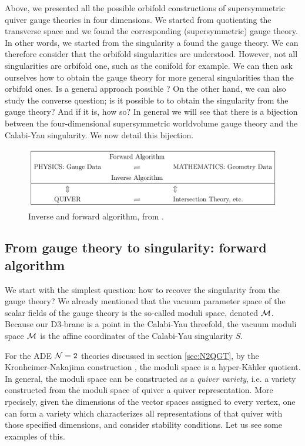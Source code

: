     Above, we presented all the possible orbifold constructions of supersymmetric quiver gauge theories in four dimensions. We started from quotienting the transverse space and we found the corresponding (supersymmetric) gauge theory. In other words, we started from the singularity a found the gauge theory. We can therefore consider that the orbifold singularities are understood. However, not all singularities are orbifold one, such as the conifold for example. We can then ask ourselves how to obtain the gauge theory for more general singularities than the orbifold ones. Is a general approach possible ? On the other hand, we can also study the converse question; is it possible to to obtain the singularity from the gauge theory? And if it is, how so? In general we will see that there is a bijection between the four-dimensional supersymmetric worldvolume gauge theory and the Calabi-Yau singularity. We now detail this bijection.

    \begin{figure}[H]
        \centering
        \includegraphics[scale=0.3]{Pictures/algorithm.png}
        \caption{Inverse and forward algorithm, from \cite{he2004lectures}.}
    \end{figure}

    \subsection{From gauge theory to singularity: forward algorithm}

        We start with the simplest question: how to recover the singularity from the gauge theory? We already mentioned that the vacuum parameter space of the scalar fields of the gauge theory is the so-called moduli space, denoted $\mathcal{M}$. Because our D$3$-brane is a point in the Calabi-Yau threefold, the vacuum moduli space $\mathcal{M}$ is the affine coordinates of the Calabi-Yau singularity $S$.

        For the ADE $\mathcal{N}=2$ theories discussed in section \ref{sec:N2QGT}, by the Kronheimer-Nakajima construction \cite{Kronheimer1990}, the moduli space is a hyper-Kähler quotient. In general, the moduli space can be constructed as a \emph{quiver variety}, i.e. a variety constructed from the moduli space of quiver a quiver representation. More rpecisely, given the dimensions of the vector spaces assigned to every vertex, one can form a variety which characterizes all representations of that quiver with those specified dimensions, and consider stability conditions. Let us see some examples of this.

